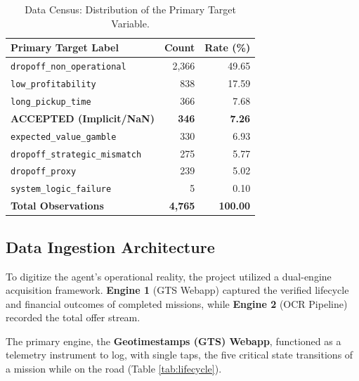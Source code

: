 \documentclass[10pt, letterpaper]{article}
\begin{document}
\begin{table}[H]
    \centering %
    \small
    \begin{tabular}{l r r} %
        \toprule
        \textbf{Primary Target Label} & \textbf{Count} & \textbf{Rate (\%)} \\
        \midrule
        \texttt{dropoff\_non\_operational} & 2,366 & 49.65 \\
        \texttt{low\_profitability} & 838 & 17.59 \\
        \texttt{long\_pickup\_time} & 366 & 7.68 \\
        \textbf{ACCEPTED (Implicit/NaN)} & \textbf{346} & \textbf{7.26} \\
        \texttt{expected\_value\_gamble} & 330 & 6.93 \\
        \texttt{dropoff\_strategic\_mismatch} & 275 & 5.77 \\
        \texttt{dropoff\_proxy} & 239 & 5.02 \\
        \texttt{system\_logic\_failure} & 5 & 0.10 \\
        \midrule
        \textbf{Total Observations} & \textbf{4,765} & \textbf{100.00} \\
        \bottomrule
    \end{tabular}
    \caption{Data Census: Distribution of the Primary Target Variable.}
    \label{tab:target_census}
\end{table}

\subsection{Data Ingestion Architecture}
To digitize the agent’s operational reality, the project utilized a dual-engine acquisition framework. \textbf{Engine 1} (GTS Webapp) captured the verified lifecycle and financial outcomes of completed missions, while \textbf{Engine 2} (OCR Pipeline) recorded the total offer stream.

The primary engine, the \textbf{Geotimestamps (GTS) Webapp}, functioned as a telemetry instrument to log, with single taps, the five critical state transitions of a mission while on the road (Table \ref{tab:lifecycle}).
\end{document}
